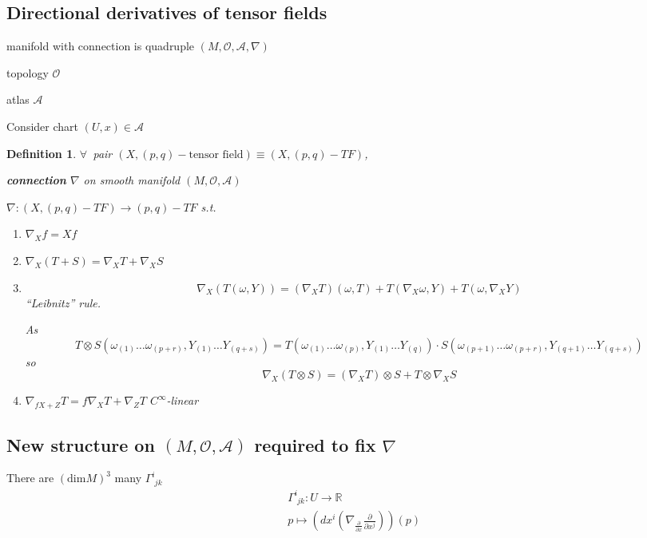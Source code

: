 \documentclass[10pt, twoside]{amsart}
\newtheorem{definition}{Definition}
\begin{document}
\begin{multicols*}{2}
\subsection{Directional derivatives of tensor fields}

manifold with connection is quadruple $(M, \mathcal{O}, \mathcal{A}, \nabla)$ 

topology $\mathcal{O}$

atlas $\mathcal{A}$

Consider chart $(U,x) \in \mathcal{A}$

\begin{definition}
$\forall \, $ pair $(X, (p,q)-\text{tensor field}) \equiv (X, (p,q)-TF)$,

\textbf{connection} $\nabla$ on smooth manifold $(M,\mathcal{O},\mathcal{A})$ 

$\nabla: ( X, (p,q)-TF) \to (p,q)-TF$ s.t.

\begin{enumerate}
  \item[(i)] $\nabla_X f = Xf $
  \item[(ii)]  $\nabla_X(T+S) = \nabla_XT + \nabla_XS $ 
\item[(iii)] \[
\nabla_X(T(\omega,Y)) = (\nabla_XT)(\omega,T) + T(\nabla_X\omega, Y) + T(\omega, \nabla_XY)
\]
``Leibnitz'' rule.

As
\[
T\otimes S (\omega_{(1)}\dots \omega_{(p+r)} , Y_{(1)} \dots Y_{(q+s)}) = T(\omega_{(1)} \dots \omega_{(p)}, Y_{(1)} \dots Y_{(q)} ) \cdot S( \omega_{(p+1)} \dots \omega_{(p+r)} , Y_{(q+1)} \dots Y_{(q+s)})
\]
so 
\[
\nabla_X(T\otimes S) = (\nabla_XT)\otimes S + T\otimes \nabla_XS
\]


\item[(iv)] $\nabla_{fX+Z} T = f\nabla_X T + \nabla_Z T$
$C^{\infty}$-linear
\end{enumerate}
\end{definition}

\subsection{New structure on $(M,\mathcal{O},\mathcal{A})$ required to fix $\nabla$}


There are $(\text{dim}M)^3$ many $\Gamma^i_{ \, \, j k}$
\[
\begin{aligned}
&  \Gamma^i_{ \, \, jk} : U \to \mathbb{R} \\ 
&  p \mapsto \left( dx^i ( \nabla_{ \frac{ \partial}{ \partial x} } \frac{ \partial }{ \partial x^j } ) \right)(p)
\end{aligned}
\]


\end{multicols*}
\end{document}
